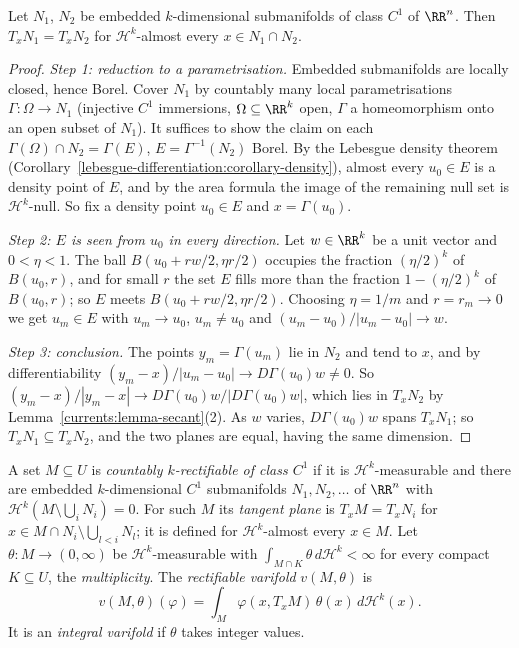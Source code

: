 \begin{lemma}\label{currents:lemma-tangent-agree}
Let $N_1$, $N_2$ be embedded $k$-dimensional submanifolds of class $C^1$ of $\RR^n$. Then $T_xN_1 = T_xN_2$ for $\mathcal{H}^k$-almost every $x \in N_1 \cap N_2$.
\end{lemma}

\begin{proof}
\emph{Step 1: reduction to a parametrisation.} Embedded submanifolds are locally closed, hence Borel. Cover $N_1$ by countably many local parametrisations $\Gamma \colon \Omega \to N_1$ (injective $C^1$
immersions, $\Omega \subseteq \RR^k$ open, $\Gamma$ a homeomorphism onto an open subset of $N_1$). It suffices to show the claim on each $\Gamma(\Omega) \cap N_2 = \Gamma(E)$, $E = \Gamma^{-1}(N_2)$ Borel. By the
Lebesgue density theorem (Corollary~\ref{lebesgue-differentiation:corollary-density}), almost every $u_0 \in E$ is a density point of $E$, and by the area formula the image of the remaining null set is
$\mathcal{H}^k$-null. So fix a density point $u_0 \in E$ and $x = \Gamma(u_0)$.

\emph{Step 2: $E$ is seen from $u_0$ in every direction.} Let $w \in \RR^k$ be a unit vector and $0 < \eta < 1$. The ball $B(u_0 + rw/2, \eta r/2)$ occupies the fraction $(\eta/2)^k$ of $B(u_0, r)$, and for small $r$
the set $E$ fills more than the fraction $1 - (\eta/2)^k$ of $B(u_0, r)$; so $E$ meets $B(u_0 + rw/2, \eta r/2)$. Choosing $\eta = 1/m$ and $r = r_m \to 0$ we get $u_m \in E$ with $u_m \to u_0$, $u_m \neq u_0$
and $(u_m - u_0)/|u_m - u_0| \to w$.

\emph{Step 3: conclusion.} The points $y_m = \Gamma(u_m)$ lie in $N_2$ and tend to $x$, and by differentiability $(y_m - x)/|u_m - u_0| \to D\Gamma(u_0)w \neq 0$. So
$(y_m - x)/|y_m - x| \to D\Gamma(u_0)w/|D\Gamma(u_0)w|$, which lies in $T_xN_2$ by Lemma~\ref{currents:lemma-secant}(2). As $w$ varies, $D\Gamma(u_0)w$ spans $T_xN_1$; so $T_xN_1 \subseteq T_xN_2$, and the
two planes are equal, having the same dimension.
\end{proof}

\begin{definition}\label{currents:definition-rectifiable-varifold}
A set $M \subseteq U$ is \emph{countably $k$-rectifiable of class $C^1$} if it is $\mathcal{H}^k$-measurable and there are embedded $k$-dimensional $C^1$ submanifolds $N_1, N_2, \ldots$ of $\RR^n$ with
$\mathcal{H}^k(M \setminus \bigcup_iN_i) = 0$. For such $M$ its \emph{tangent plane} is $T_xM = T_xN_i$ for $x \in M \cap N_i \setminus \bigcup_{l < i}N_l$; it is defined for $\mathcal{H}^k$-almost every
$x \in M$. Let $\theta \colon M \to (0, \infty)$ be $\mathcal{H}^k$-measurable with $\int_{M \cap K}\theta\,d\mathcal{H}^k < \infty$ for every compact $K \subseteq U$, the \emph{multiplicity}. The
\emph{rectifiable varifold} $v(M, \theta)$ is
\[
v(M, \theta)(\varphi) = \int_M\varphi(x, T_xM)\,\theta(x)\,d\mathcal{H}^k(x) .
\]
It is an \emph{integral varifold} if $\theta$ takes integer values.
\end{definition}

